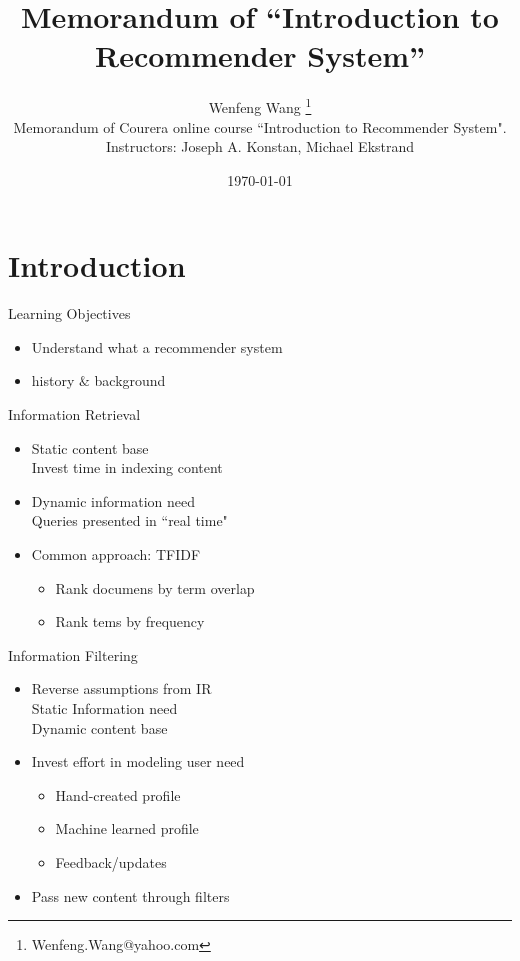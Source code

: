 \documentclass[fleqn,twoside]{article}
\begin{document}
\title{Memorandum of ``Introduction to Recommender System''}

\author{ Wenfeng Wang \footnote{ Wenfeng.Wang@yahoo.com}\\
  Memorandum of Courera online course  ``Introduction to Recommender System".
  \\
 Instructors: Joseph A. Konstan, Michael Ekstrand
}
\date{\today}

\maketitle

\tableofcontents
%

\section{Introduction}

Learning Objectives
\begin{itemize}
 \item Understand what a recommender system
 \item history $\&$ background
\end{itemize}

Information Retrieval
\begin{itemize}
\item Static content base \\
     Invest time in indexing content
\item Dynamic information need \\
    Queries presented in ``real time"
\item Common approach: TFIDF
	\begin{itemize}
	  \item Rank documens by term overlap
	   \item Rank tems by frequency
	\end{itemize}
\end{itemize}

Information Filtering
\begin{itemize}
\item Reverse assumptions from IR  \\
	Static Information need \\
	Dynamic content base 
 \item Invest effort in modeling user need
	\begin{itemize}
	  \item  Hand-created profile
	  \item Machine learned profile
	  \item Feedback/updates
	\end{itemize}
 \item Pass new content through filters
\end{itemize}
\end{document}

